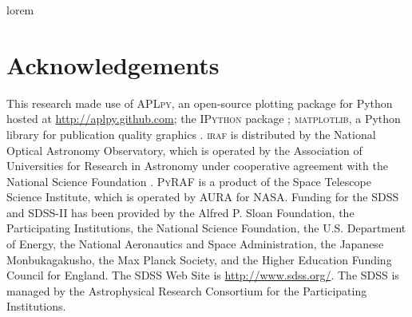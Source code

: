 \documentclass[fleqn,usenatbib]{mnras}
\begin{document}
lorem

\section*{Acknowledgements} This research made use of \textsc{APLpy}, an open-source plotting package for Python hosted at \url{http://aplpy.github.com}; the \textsc{IPython} package \citep{Perez2007}; \textsc{matplotlib}, a Python library for publication quality graphics \citep{Hunter2007}. \textsc{iraf} is distributed by the National Optical Astronomy Observatory, which is operated by the Association of Universities for Research in Astronomy under cooperative agreement with the National Science Foundation \citep{Tody1993}. \textsc{PyRAF} is a product of the Space Telescope Science Institute, which is operated by AURA for NASA. Funding for the SDSS and SDSS-II has been provided by the Alfred P. Sloan Foundation, the Participating Institutions, the National Science Foundation, the U.S. Department of Energy, the National Aeronautics and Space Administration, the Japanese Monbukagakusho, the Max Planck Society, and the Higher Education Funding Council for England. The SDSS Web Site is \url{http://www.sdss.org/}. The SDSS is managed by the Astrophysical Research Consortium for the Participating Institutions.

 
 



\bsp 

\label{lastpage} 
\end{document}
